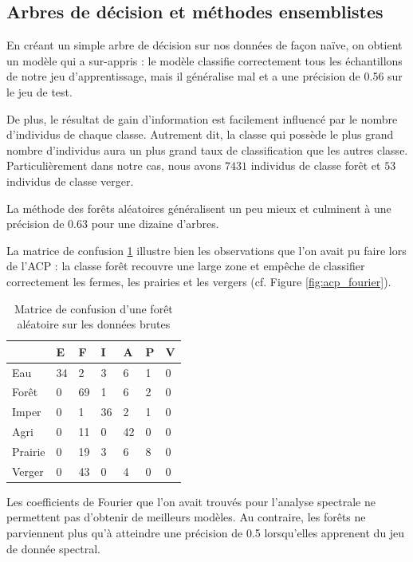 \documentclass[twocolumn,10pt]{article}
\begin{document}
\subsection{Arbres de décision et méthodes ensemblistes}
En créant un simple arbre de décision sur nos données de façon naïve, on obtient un modèle qui a sur-appris : le modèle classifie correctement tous les échantillons de notre jeu d'apprentissage, mais il généralise mal et a une précision de 0.56 sur le jeu de test. 

De plus, le résultat de gain d'information est facilement influencé par le nombre d'individus de chaque classe. Autrement dit, la classe qui possède le plus grand nombre d'individus aura un plus grand taux de classification que les autres classe. Particulièrement dans notre cas, nous avons $ 7431 $ individus de classe forêt et $ 53 $ individus de classe verger.

La méthode des forêts aléatoires généralisent un peu mieux et culminent à une précision de 0.63 pour une dizaine d'arbres.

La matrice de confusion \ref{confusion_matrix} illustre bien les observations que l'on avait pu faire lors de l'ACP : la classe forêt recouvre une large zone et empêche de classifier correctement les fermes, les prairies et les vergers (cf. Figure \ref{fig:acp_fourier}).

\begin{table}[h]
	\caption{Matrice de confusion d'une forêt aléatoire sur les données brutes}
	\label{confusion_matrix}
	\begin{tabular}{l|llllll}
		        & E  & F  & I  & A  & P & V \\ \hline
		Eau     & 34 & 2  & 3  & 6  & 1 & 0 \\
		Forêt   & 0  & 69 & 1  & 6  & 2 & 0 \\
		Imper   & 0  & 1  & 36 & 2  & 1 & 0 \\
		Agri    & 0  & 11 & 0  & 42 & 0 & 0 \\
		Prairie & 0  & 19 & 3  & 6  & 8 & 0 \\
		Verger  & 0  & 43 & 0  & 4  & 0 & 0
	 \end{tabular}
\end{table}

Les coefficients de Fourier que l'on avait trouvés pour l'analyse spectrale ne permettent pas d'obtenir de meilleurs modèles. Au contraire, les forêts ne parviennent plus qu'à atteindre une précision de 0.5 lorsqu'elles apprenent du jeu de donnée spectral.
\end{document}
